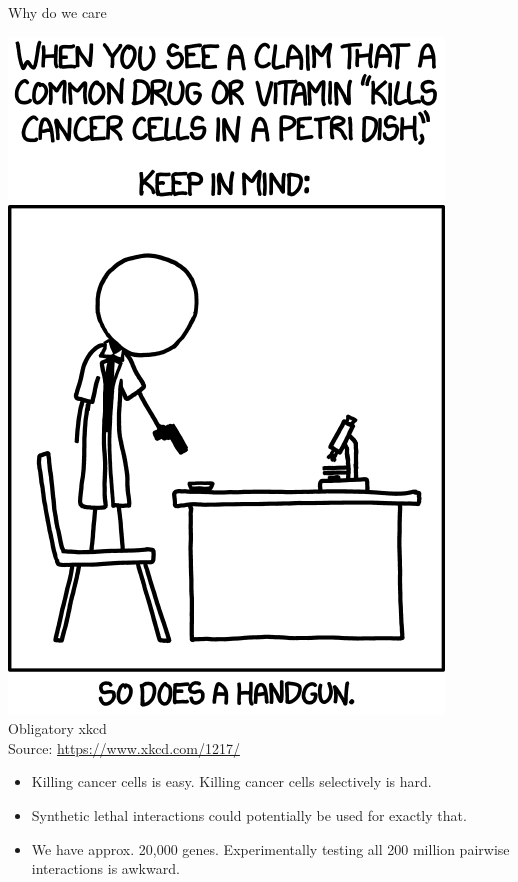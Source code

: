 \documentclass[8pt]{beamer}
\begin{document}
\begin{frame}{Why do we care}
\begin{minipage}{0.4\linewidth}
\includegraphics[width=0.8\linewidth]{"cells_2x"}\\[-1ex]
	{\tiny Obligatory xkcd\\Source: \href{https://www.xkcd.com/1217/}{https://www.xkcd.com/1217/}}
\end{minipage}%
\begin{minipage}{0.6\linewidth}
\begin{itemize}
	\item Killing cancer cells is easy. Killing cancer cells selectively is hard.
	\item Synthetic lethal interactions could potentially be used for exactly that.
	\item We have approx. 20,000 genes. Experimentally testing all 200 million pairwise interactions is awkward.
\end{itemize}
\end{minipage}



\end{frame}
\end{document}
